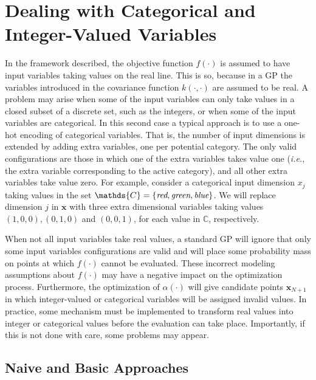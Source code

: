 \section{Dealing with Categorical and Integer-Valued Variables}\label{sec:dealing}
In the framework described, the objective function $f(\cdot)$
is assumed to have input variables taking values on the real line. This is so, because in a GP the variables
introduced in the covariance function $k(\cdot,\cdot)$ are assumed to be real. A problem
may arise when some of the input variables can only take values in a closed subset of a discrete set, such as the
integers, or when some of the input variables are categorical. In this second case a typical approach
is to use a one-hot encoding of categorical variables. That is, the number of input dimensions is extended
by adding extra variables, one per potential category. The only valid configurations are those in which
one of the extra variables takes value one (\emph{i.e.}, the extra variable corresponding to the active category),
and all other extra variables take value zero.  For example, consider a categorical input dimension
$x_j$ taking values in the set $\mathds{C}=\{\emph{red}, \emph{green}, \emph{blue}\}$.
We will replace dimension $j$ in $\mathbf{x}$ with three extra dimensional variables taking
values $(1,0,0), (0, 1, 0)$ and $(0,0,1)$, for each value in $\mathds{C}$, respectively.

When not all input variables take real values, a standard GP will ignore that only some input variables configurations
are valid and will place some probability mass on points at which $f(\cdot)$ cannot be evaluated. These incorrect
modeling assumptions about $f(\cdot)$ may have a negative impact on the optimization process.
Furthermore, the optimization of $\alpha(\cdot)$ will give candidate points $\mathbf{x}_{N+1}$
in which integer-valued or categorical variables will be assigned invalid values. In practice, some mechanism must
be implemented to transform real values into integer or categorical values before the evaluation can take place.
Importantly, if this is not done with care, some problems may appear.

\subsection{Naive and Basic Approaches}
\label{sec:basic_naive}

